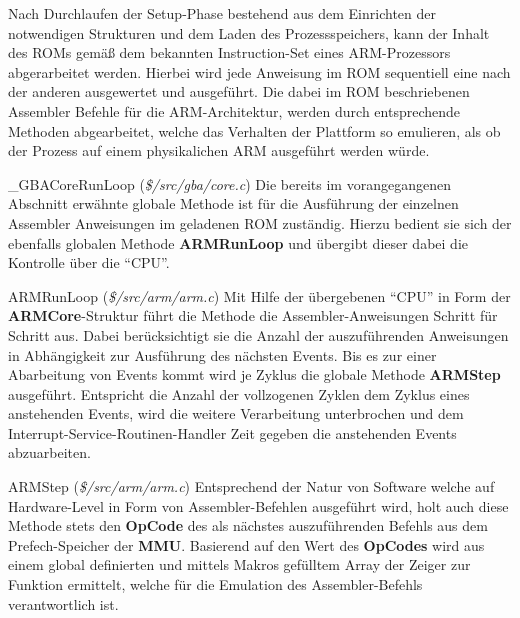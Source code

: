 \documentclass[11pt,a4paper]{scrartcl}
\begin{document}
Nach Durchlaufen der Setup-Phase bestehend aus dem Einrichten der notwendigen Strukturen und dem Laden des Prozessspeichers, kann der Inhalt des ROMs gem\"a{\ss} dem bekannten Instruction-Set eines ARM-Prozessors abgerarbeitet werden. Hierbei wird jede Anweisung im ROM sequentiell eine nach der anderen ausgewertet und ausgef\"uhrt. Die dabei im ROM beschriebenen Assembler Befehle f\"ur die ARM-Architektur, werden durch entsprechende Methoden abgearbeitet, welche das Verhalten der Plattform so emulieren, als ob der Prozess auf einem physikalichen ARM ausgef\"uhrt werden w\"urde.

\vspace{5mm}
\large {\_}GBACoreRunLoop \normalsize(\textit{\$/src/gba/core.c})
\vspace{2mm}\newline
Die bereits im vorangegangenen Abschnitt erw\"ahnte globale Methode ist f\"ur die Ausf\"uhrung der einzelnen Assembler Anweisungen im geladenen ROM zust\"andig. Hierzu bedient sie sich der ebenfalls globalen Methode \textbf{ARMRunLoop} und \"ubergibt dieser dabei die Kontrolle \"uber die \enquote{CPU}.

\vspace{5mm}
\large ARMRunLoop \normalsize(\textit{\$/src/arm/arm.c})
\vspace{2mm}\newline
Mit Hilfe der \"ubergebenen \enquote{CPU} in Form der \textbf{ARMCore}-Struktur f\"uhrt die Methode die Assembler-Anweisungen Schritt f\"ur Schritt aus. Dabei ber\"ucksichtigt sie die Anzahl der auszuf\"uhrenden Anweisungen in Abh\"angigkeit zur Ausf\"uhrung des n\"achsten Events. Bis es zur einer Abarbeitung von Events kommt wird je Zyklus die globale Methode \textbf{ARMStep} ausgef\"uhrt. Entspricht die Anzahl der vollzogenen Zyklen dem Zyklus eines anstehenden Events, wird die weitere Verarbeitung unterbrochen und dem Interrupt-Service-Routinen-Handler Zeit gegeben die anstehenden Events abzuarbeiten.

\vspace{5mm}
\large ARMStep \normalsize(\textit{\$/src/arm/arm.c})
\vspace{2mm}\newline
Entsprechend der Natur von Software welche auf Hardware-Level in Form von Assembler-Befehlen ausgef\"uhrt wird, holt auch diese Methode stets den \textbf{OpCode} des als n\"achstes auszuf\"uhrenden Befehls aus dem Prefech-Speicher der \textbf{MMU}. Basierend auf den Wert des \textbf{OpCodes} wird aus einem global definierten und mittels Makros gef\"ulltem Array der Zeiger zur Funktion ermittelt, welche f\"ur die Emulation des Assembler-Befehls verantwortlich ist.
\end{document}
